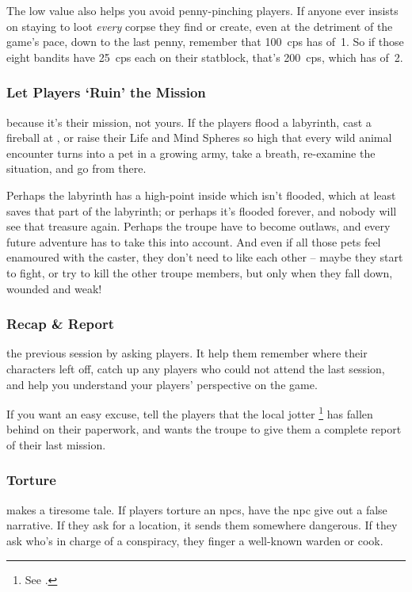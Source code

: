 \begin{multicols}{2}
The low value also helps you avoid penny-pinching players.
If anyone ever insists on staying to loot \emph{every} corpse they find or create, even at the detriment of the game's pace, down to the last penny, remember that 100~\glspl{cp} has  of~1.
So if those eight bandits have 25~\glspl{cp} each on their statblock, that's 200~\glspl{cp}, which has  of~2.

\subsubsection{Let Players `Ruin' the Mission}
because it's their mission, not yours.
If the players flood a labyrinth, cast a fireball at , or raise their Life and Mind Spheres so high that every wild animal encounter turns into a pet in a growing army, take a breath, re-examine the situation, and go from there.

Perhaps the labyrinth has a high-point inside which isn't flooded, which at least saves that part of the labyrinth; or perhaps it's flooded forever, and nobody will see that treasure again.
Perhaps the troupe have to become outlaws, and every future adventure has to take this into account.
And even if all those pets feel enamoured with the caster, they don't need to like each other -- maybe they start to fight, or try to kill the other troupe members, but only when they fall down, wounded and weak!

\subsubsection{Recap \& Report}
the previous session by asking players.
It help them remember where their characters left off, catch up any players who could not attend the last session, and help you understand your players' perspective on the game.

If you want an easy excuse, tell the players that the local \gls{jotter}%
\footnote{See .}
has fallen behind on their paperwork, and wants the troupe to give them a complete report of their last mission.

\subsubsection{Torture}
makes a tiresome tale.
If players torture an \glspl{npc}, have the \gls{npc} give out a false narrative.
If they ask for a location, it sends them somewhere dangerous.
If they ask who's in charge of a conspiracy, they finger a well-known \gls{warden} or cook.


\end{multicols}
